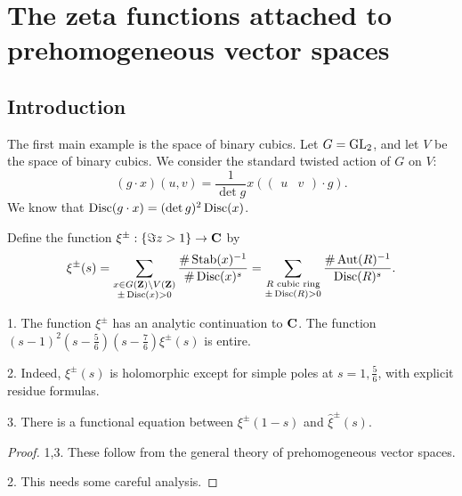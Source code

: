 
\section{The zeta functions attached to prehomogeneous vector spaces}





\subsection{Introduction}

The first main example is the space of binary cubics. Let $G=\operatorname{GL}_2$, 
and let $V$ be the space of binary cubics. We consider the standard twisted 
action of $G$ on $V$: 
\[
  (g\cdot x)(u,v) = \frac{1}{\det g} x\left(\begin{pmatrix} u & v \end{pmatrix} \cdot g\right) .
\]
We know that $\operatorname{Disc}(g\cdot x) = (\det g)^2 \operatorname{Disc}(x)$. 

\begin{defi}[Shintani]
Define the function $\xi^\pm:\{\Im z>1\} \to \mathbf{C}$ by 
\[
  \xi^\pm(s) 
    = \sum_{\substack{x\in G(\mathbf{Z})\backslash V(\mathbf{Z}) \\ \pm \operatorname{Disc}(x)>0}} \frac{\# \operatorname{Stab}(x)^{-1}}{\# \operatorname{Disc}(x)^s} = \sum_{\substack{R\text{ cubic ring} \\ \pm \operatorname{Disc}(R)>0}} \frac{\# \operatorname{Aut}(R)^{-1}}{\operatorname{Disc}(R)^s} .
\]
\end{defi}

\begin{theo}
1. The function $\xi^\pm$ has an analytic continuation to $\mathbf{C}$. The %
function $(s-1)^2 (s-\frac 5 6)(s-\frac 7 6)\xi^\pm(s)$ is entire. 

2. Indeed, $\xi^\pm(s)$ is holomorphic except for simple poles %
at $s=1,\frac 5 6$, with explicit residue formulas. 

3. There is a functional equation between $\xi^\pm(1-s)$ and %
$\widehat\xi^\pm(s)$. 
\end{theo}
\begin{proof}
1,3. These follow from the general theory of prehomogeneous vector spaces. 

2. This needs some careful analysis. 
\end{proof}

